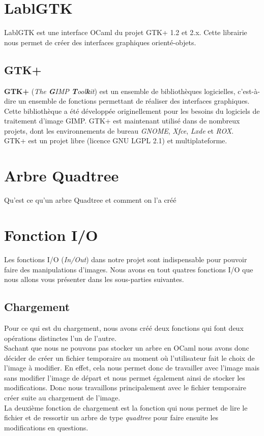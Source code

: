 \documentclass[12pt]{article}
\begin{document}
\section{LablGTK}
LablGTK est une interface OCaml du projet GTK+ 1.2 et 2.x. Cette librairie nous permet de créer des interfaces graphiques orienté-objets.
\subsection{GTK+}
\textbf{GTK+} (\textit{The \textbf{G}IMP \textbf{T}ool\textbf{k}it}) est un ensemble de bibliothèques logicielles, c'est-à-dire un ensemble de fonctions permettant de réaliser des interfaces graphiques. Cette bibliothèque a été développée originellement pour les besoins du logiciels de traitement d'image GIMP. GTK+ est maintenant utilisé dans de nombreux projets, dont les environnements de bureau \textit{GNOME}, \textit{Xfce}, \textit{Lxde} et \textit{ROX}. \\
GTK+ est un projet libre (licence GNU LGPL 2.1) et multiplateforme.
\section{Arbre Quadtree}
Qu'est ce qu'un arbre Quadtree et comment on l'a créé
\section{Fonction I/O}
Les fonctions I/O (\textit{In/Out}) dans notre projet sont indispensable pour pouvoir faire des manipulations d'images. Nous avons en tout quatres fonctions I/O que nous allons vous présenter dans les sous-parties suivantes. 
\subsection{Chargement}
Pour ce qui est du chargement, nous avons créé deux fonctions qui font deux opérations distinctes l'un de l'autre. \\
Sachant que nous ne pouvons pas stocker un arbre en OCaml nous avons donc décider de créer un fichier temporaire au moment où l'utilisateur fait le choix de l'image à modifier. En effet, cela nous permet donc de travailler avec l'image mais sans modifier l'image de départ et nous permet également ainsi de stocker les modifications. Donc nous travaillons principalement avec le fichier temporaire créer suite au chargement de l'image. \\
La deuxième fonction de chargement est la fonction qui nous permet de lire le fichier et de ressortir un arbre de type \textit{quadtree} pour faire ensuite les modifications en questions.
\end{document}
